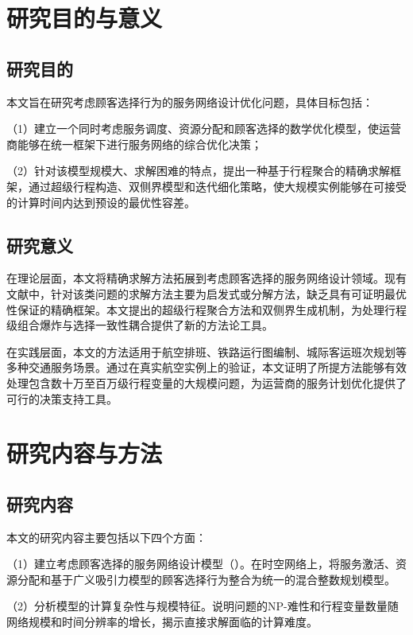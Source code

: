 \section{研究目的与意义}

\subsection{研究目的}

本文旨在研究考虑顾客选择行为的服务网络设计优化问题，具体目标包括：

（1）建立一个同时考虑服务调度、资源分配和顾客选择的数学优化模型，使运营商能够在统一框架下进行服务网络的综合优化决策；

（2）针对该模型规模大、求解困难的特点，提出一种基于行程聚合的精确求解框架，通过超级行程构造、双侧界模型和迭代细化策略，使大规模实例能够在可接受的计算时间内达到预设的最优性容差。

\subsection{研究意义}

在理论层面，本文将精确求解方法拓展到考虑顾客选择的服务网络设计领域。现有文献中，针对该类问题的求解方法主要为启发式或分解方法，缺乏具有可证明最优性保证的精确框架。本文提出的超级行程聚合方法和双侧界生成机制，为处理行程级组合爆炸与选择一致性耦合提供了新的方法论工具。

在实践层面，本文的方法适用于航空排班、铁路运行图编制、城际客运班次规划等多种交通服务场景。通过在真实航空实例上的验证，本文证明了所提方法能够有效处理包含数十万至百万级行程变量的大规模问题，为运营商的服务计划优化提供了可行的决策支持工具。

\section{研究内容与方法}

\subsection{研究内容}

本文的研究内容主要包括以下四个方面：

（1）建立考虑顾客选择的服务网络设计模型（\problemNotation）。在时空网络上，将服务激活、资源分配和基于广义吸引力模型的顾客选择行为整合为统一的混合整数规划模型。

（2）分析模型的计算复杂性与规模特征。说明问题的NP-难性和行程变量数量随网络规模和时间分辨率的增长，揭示直接求解面临的计算难度。

